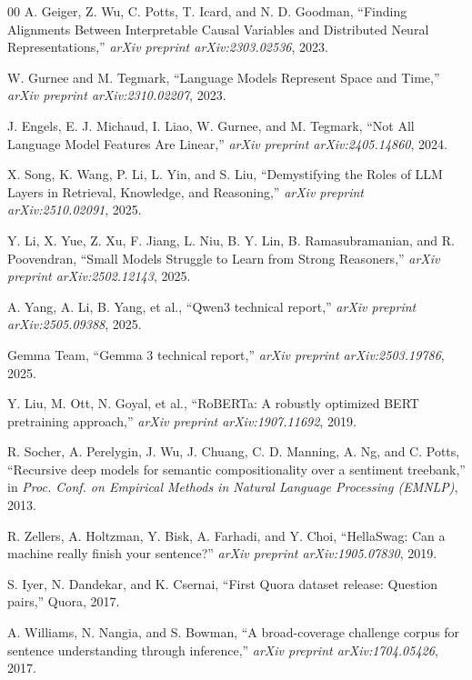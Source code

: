 \documentclass[conference]{IEEEtran}
\begin{document}
\begin{thebibliography}{00}
		A. Geiger, Z. Wu, C. Potts, T. Icard, and N. D. Goodman, ``Finding Alignments Between Interpretable Causal Variables and Distributed Neural Representations,'' \textit{arXiv preprint arXiv:2303.02536}, 2023.
		
		W. Gurnee and M. Tegmark, ``Language Models Represent Space and Time,'' \textit{arXiv preprint arXiv:2310.02207}, 2023.
		
		J. Engels, E. J. Michaud, I. Liao, W. Gurnee, and M. Tegmark, ``Not All Language Model Features Are Linear,'' \textit{arXiv preprint arXiv:2405.14860}, 2024.
		
		X. Song, K. Wang, P. Li, L. Yin, and S. Liu, ``Demystifying the Roles of LLM Layers in Retrieval, Knowledge, and Reasoning,'' \textit{arXiv preprint arXiv:2510.02091}, 2025.
		
		Y. Li, X. Yue, Z. Xu, F. Jiang, L. Niu, B. Y. Lin, B. Ramasubramanian, and R. Poovendran, ``Small Models Struggle to Learn from Strong Reasoners,'' \textit{arXiv preprint arXiv:2502.12143}, 2025.
		
		A. Yang, A. Li, B. Yang, et al., ``Qwen3 technical report,'' \textit{arXiv preprint arXiv:2505.09388}, 2025.
		
		Gemma Team, ``Gemma 3 technical report,'' \textit{arXiv preprint arXiv:2503.19786}, 2025.
		
		Y. Liu, M. Ott, N. Goyal, et al., ``RoBERTa: A robustly optimized BERT pretraining approach,'' \textit{arXiv preprint arXiv:1907.11692}, 2019.
		
		R. Socher, A. Perelygin, J. Wu, J. Chuang, C. D. Manning, A. Ng, and C. Potts, ``Recursive deep models for semantic compositionality over a sentiment treebank,'' in \textit{Proc. Conf. on Empirical Methods in Natural Language Processing (EMNLP)}, 2013.
		
		R. Zellers, A. Holtzman, Y. Bisk, A. Farhadi, and Y. Choi, ``HellaSwag: Can a machine really finish your sentence?'' \textit{arXiv preprint arXiv:1905.07830}, 2019.
		
		S. Iyer, N. Dandekar, and K. Csernai, ``First Quora dataset release: Question pairs,'' Quora, 2017.
		
		A. Williams, N. Nangia, and S. Bowman, ``A broad-coverage challenge corpus for sentence understanding through inference,'' \textit{arXiv preprint arXiv:1704.05426}, 2017.
	\end{thebibliography}
	
\end{document}
